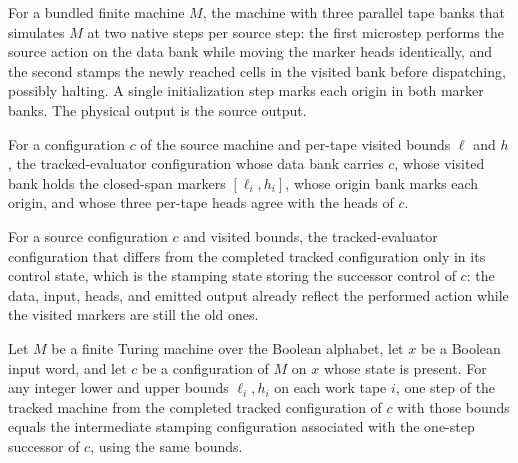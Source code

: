 \begin{definition}
\label{Turing.FinTM.emCallTrackTM}
\leanok
{}
For a bundled finite machine $M$, the machine with three parallel tape banks that
simulates $M$ at two native steps per source step: the first microstep performs the
source action on the data bank while moving the marker heads identically, and the second
stamps the newly reached cells in the visited bank before dispatching, possibly halting.
A single initialization step marks each origin in both marker banks. The physical output
is the source output.
\end{definition}

\begin{definition}
\label{Turing.FinTM.emCallTrackCfg}
\leanok
{}
For a configuration $c$ of the source machine and per-tape visited bounds $\ell$ and
$h$, the tracked-evaluator configuration whose data bank carries $c$, whose visited bank
holds the closed-span markers $[\ell_i, h_i]$, whose origin bank marks each origin, and
whose three per-tape heads agree with the heads of $c$.
\end{definition}

\begin{definition}
\label{Turing.FinTM.emCallTrackMid}
\leanok
{}
For a source configuration $c$ and visited bounds, the tracked-evaluator configuration
that differs from the completed tracked configuration only in its control state, which
is the stamping state storing the successor control of $c$: the data, input, heads, and
emitted output already reflect the performed action while the visited markers are still
the old ones.
\end{definition}

\begin{lemma}
\label{Turing.FinTM.emCall_track_action}
\leanok
{}
Let $M$ be a finite Turing machine over the Boolean alphabet, let $x$ be a Boolean input
word, and let $c$ be a configuration of $M$ on $x$ whose state is present. For any
integer lower and upper bounds $\ell_i,h_i$ on each work tape $i$, one step of the
tracked machine from the completed tracked configuration of $c$ with those bounds equals
the intermediate stamping configuration associated with the one-step successor of $c$,
using the same bounds.
\end{lemma}

